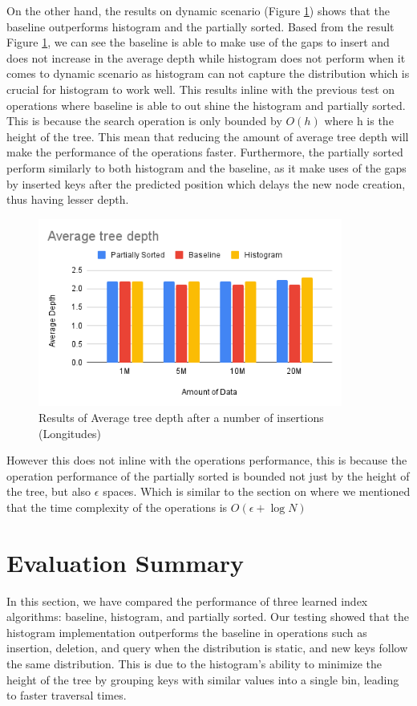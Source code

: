 On the other hand, the results on dynamic scenario (Figure \ref{fig:AverageTreeDepthLong}) shows that the baseline outperforms histogram and the partially sorted. Based from the result Figure \ref{fig:AverageTreeDepthLong}, we can see the baseline is able to make use of the gaps to insert and does not increase in the average depth while histogram does not perform when it comes to dynamic scenario as histogram can not capture the distribution which is crucial for histogram to work well. This results inline with the previous test on operations where baseline is able to out shine the histogram and partially sorted. This is because the search operation is only bounded by $O(h)$ where h is the height of the tree. This mean that reducing the amount of average tree depth will make the performance of the operations faster. 
Furthermore, the partially sorted perform similarly to both histogram and the baseline, as it make uses of the gaps by inserted keys after the predicted position which delays the new node creation, thus having lesser depth. 
\begin{figure}[H]
    \centering
    \includegraphics[width=100mm,scale=1]{Figures/AVGTD-Long.png}
    \caption{
     Results of Average tree depth after a number of insertions (Longitudes)
    }
    \label{fig:AverageTreeDepthLong}
\end{figure}
However this does not inline with the operations performance, this is because the operation performance of the partially sorted is bounded not just by the height of the tree, but also $\epsilon$ spaces. Which is similar to the section on  where we mentioned that the time complexity of the operations is $O(\epsilon + \log N)$



\section{Evaluation Summary}
In this section, we have compared the performance of three learned index algorithms: baseline, histogram, and partially sorted. Our testing showed that the histogram implementation outperforms the baseline in operations such as insertion, deletion, and query when the distribution is static, and new keys follow the same distribution. This is due to the histogram's ability to minimize the height of the tree by grouping keys with similar values into a single bin, leading to faster traversal times.

